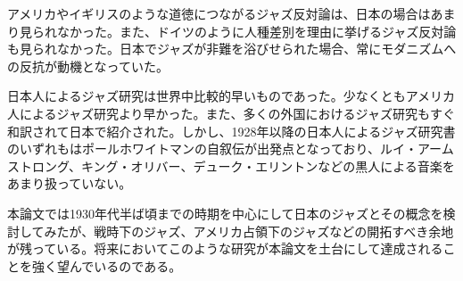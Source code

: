 アメリカやイギリスのような道徳につながるジャズ反対論は、日本の場合はあまり見られなかった。また、ドイツのように人種差別を理由に挙げるジャズ反対論も見られなかった。日本でジャズが非難を浴びせられた場合、常にモダニズムへの反抗が動機となっていた。

日本人によるジャズ研究は世界中比較的早いものであった。少なくともアメリカ人によるジャズ研究より早かった。また、多くの外国におけるジャズ研究もすぐ和訳されて日本で紹介された。しかし、1928年以降の日本人によるジャズ研究書のいずれもはポールホワイトマンの自叙伝が出発点となっており、ルイ・アームストロング、キング・オリバー、デューク・エリントンなどの黒人による音楽をあまり扱っていない。

本論文では1930年代半ば頃までの時期を中心にして日本のジャズとその概念を検討してみたが、戦時下のジャズ、アメリカ占領下のジャズなどの開拓すべき余地が残っている。将来においてこのような研究が本論文を土台にして達成されることを強く望んでいるのである。

